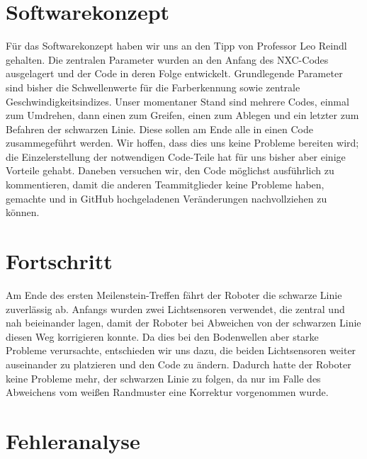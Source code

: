 \documentclass[11pt,a4paper]{article}
\begin{document}
\section{Softwarekonzept}

Für das Softwarekonzept haben wir uns an den Tipp von Professor Leo Reindl gehalten. Die zentralen Parameter wurden an den Anfang des
NXC-Codes ausgelagert und der Code in deren Folge entwickelt. Grundlegende Parameter sind bisher die Schwellenwerte für die Farberkennung
sowie zentrale Geschwindigkeitsindizes. Unser momentaner Stand sind mehrere Codes, einmal zum Umdrehen, dann einen zum Greifen, einen zum Ablegen
und ein letzter zum Befahren der schwarzen Linie. Diese sollen am Ende alle in einen Code zusammegeführt werden. Wir hoffen, dass dies uns keine 
Probleme bereiten wird; die Einzelerstellung der notwendigen Code-Teile hat für uns bisher aber einige Vorteile gehabt. 
Daneben versuchen wir, den Code möglichst ausführlich zu kommentieren, damit die anderen Teammitglieder keine Probleme haben, gemachte und 
in GitHub hochgeladenen Veränderungen nachvollziehen zu können. 

\section{Fortschritt}

Am Ende des ersten Meilenstein-Treffen fährt der Roboter die schwarze Linie zuverlässig ab. Anfangs wurden zwei Lichtsensoren verwendet, 
die zentral und nah beieinander lagen, damit der Roboter bei Abweichen von der schwarzen Linie diesen Weg korrigieren konnte. 
Da dies bei den Bodenwellen aber starke Probleme verursachte, entschieden wir uns dazu, die beiden Lichtsensoren weiter auseinander zu 
platzieren und den Code zu ändern. Dadurch hatte der Roboter keine Probleme mehr, der schwarzen Linie zu folgen, da nur im Falle des Abweichens
vom weißen Randmuster eine Korrektur vorgenommen wurde.  

\section{Fehleranalyse}
\end{document}

